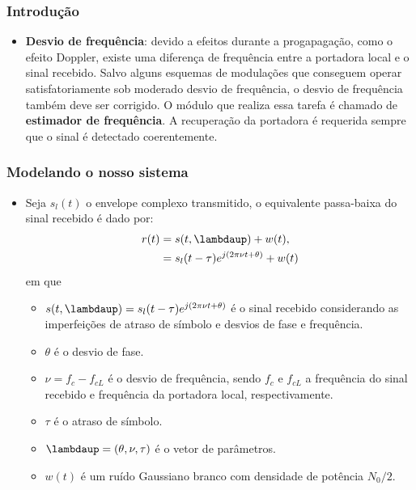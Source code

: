 \begin{frame}[t]
	\frametitle{Introdução}
    \begin{itemize}
        \item \textbf{Desvio de frequência}: devido a efeitos durante a progapagação, como o efeito Doppler, existe uma diferença de frequência entre a portadora local e o sinal recebido. Salvo alguns esquemas de modulações que conseguem operar satisfatoriamente sob moderado desvio de frequência, o desvio de frequência também deve ser corrigido. O módulo que realiza essa tarefa é chamado de \textbf{estimador de frequência}. A recuperação da portadora é requerida sempre que o sinal é detectado coerentemente.
    \end{itemize}
\end{frame}

\begin{frame}[t]
	\frametitle{Modelando o nosso sistema}
	\begin{itemize}		
	
		\item Seja \(s_l (t)\) o envelope complexo transmitido, o equivalente passa-baixa do sinal recebido é dado por:
		\begin{align}
            r(t) & = s(t, \boldsymbol{\lambdaup}) + w(t), \nonumber \\
                 & = s_l (t-\tau) e^{j(2\pi \nu t + \theta)} + w(t)
            \label{eq:r_t}
        \end{align}
        em que
        \begin{itemize}
            \item \(s(t, \boldsymbol{\lambdaup}) = s_l (t-\tau) e^{j(2\pi \nu t + \theta)}\) é o sinal recebido considerando as imperfeições de atraso de símbolo e desvios de fase e frequência.
            \item \(\theta\) é o desvio de fase.
            \item \(\nu = f_c - f_{cL}\) é o desvio de frequência, sendo \(f_c\) e \(f_{cL}\) a frequência do sinal recebido e frequência da portadora local, respectivamente.
            \item \(\tau\) é o atraso de símbolo.
            \item \(\boldsymbol{\lambdaup} = (\theta, \nu, \tau)\) é o vetor de parâmetros.
            \item \(w(t)\) é um ruído Gaussiano branco com densidade de potência \(N_0/2\).
        \end{itemize}
	\end{itemize}
	
\end{frame}

